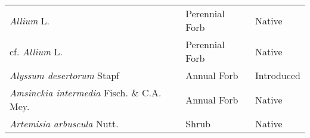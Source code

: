 \documentclass[8pt,]{article}
\begin{document}
\begin{longtable}[]{@{}lll@{}}
\begin{minipage}[t]{0.49\columnwidth}
\emph{Allium} L.\strut
\end{minipage} & \begin{minipage}[t]{0.27\columnwidth}\raggedright\strut
Perennial Forb\strut
\end{minipage} & \begin{minipage}[t]{0.15\columnwidth}\raggedright\strut
Native\strut
\end{minipage}\tabularnewline
\begin{minipage}[t]{0.49\columnwidth}\raggedright\strut
cf. \emph{Allium} L.\strut
\end{minipage} & \begin{minipage}[t]{0.27\columnwidth}\raggedright\strut
Perennial Forb\strut
\end{minipage} & \begin{minipage}[t]{0.15\columnwidth}\raggedright\strut
Native\strut
\end{minipage}\tabularnewline
\begin{minipage}[t]{0.49\columnwidth}\raggedright\strut
\emph{Alyssum desertorum} Stapf\strut
\end{minipage} & \begin{minipage}[t]{0.27\columnwidth}\raggedright\strut
Annual Forb\strut
\end{minipage} & \begin{minipage}[t]{0.15\columnwidth}\raggedright\strut
Introduced\strut
\end{minipage}\tabularnewline
\begin{minipage}[t]{0.49\columnwidth}\raggedright\strut
\emph{Amsinckia intermedia} Fisch. \& C.A. Mey.\strut
\end{minipage} & \begin{minipage}[t]{0.27\columnwidth}\raggedright\strut
Annual Forb\strut
\end{minipage} & \begin{minipage}[t]{0.15\columnwidth}\raggedright\strut
Native\strut
\end{minipage}\tabularnewline
\begin{minipage}[t]{0.49\columnwidth}\raggedright\strut
\emph{Artemisia arbuscula} Nutt.\strut
\end{minipage} & \begin{minipage}[t]{0.27\columnwidth}\raggedright\strut
Shrub\strut
\end{minipage} & \begin{minipage}[t]{0.15\columnwidth}\raggedright\strut
Native\strut
\end{minipage}\tabularnewline

\end{longtable}
\end{document}
